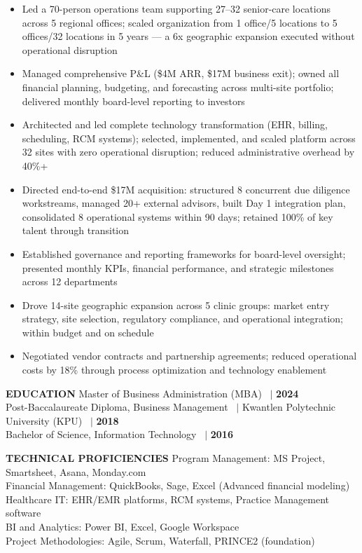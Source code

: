 \documentclass[10pt]{article}
\begin{document}
\begin{itemize}[leftmargin=15pt,itemsep=3pt]
\item Led a 70-person operations team supporting 27--32 senior-care locations across 5 regional offices; scaled organization from 1 office/5 locations to 5 offices/32 locations in 5 years --- a 6x geographic expansion executed without operational disruption
\item Managed comprehensive P\&L (\$4M ARR, \$17M business exit); owned all financial planning, budgeting, and forecasting across multi-site portfolio; delivered monthly board-level reporting to investors
\item Architected and led complete technology transformation (EHR, billing, scheduling, RCM systems); selected, implemented, and scaled platform across 32 sites with zero operational disruption; reduced administrative overhead by 40\%+
\item Directed end-to-end \$17M acquisition: structured 8 concurrent due diligence workstreams, managed 20+ external advisors, built Day 1 integration plan, consolidated 8 operational systems within 90 days; retained 100\% of key talent through transition
\item Established governance and reporting frameworks for board-level oversight; presented monthly KPIs, financial performance, and strategic milestones across 12 departments
\item Drove 14-site geographic expansion across 5 clinic groups: market entry strategy, site selection, regulatory compliance, and operational integration; within budget and on schedule
\item Negotiated vendor contracts and partnership agreements; reduced operational costs by 18\% through process optimization and technology enablement
\end{itemize}

\vspace{8pt}
\noindent\textbf{EDUCATION}\nopagebreak
\vspace{4pt}
\nopagebreak
Master of Business Administration (MBA) \ $|$ \textbf{2024} \\
Post-Baccalaureate Diploma, Business Management \ $|$ Kwantlen Polytechnic University (KPU) \ $|$ \textbf{2018} \\
Bachelor of Science, Information Technology \ $|$ \textbf{2016}

\vspace{8pt}
\noindent\textbf{TECHNICAL PROFICIENCIES}\nopagebreak
\vspace{4pt}
\nopagebreak
Program Management: MS Project, Smartsheet, Asana, Monday.com \\
Financial Management: QuickBooks, Sage, Excel (Advanced financial modeling) \\
Healthcare IT: EHR/EMR platforms, RCM systems, Practice Management software \\
BI and Analytics: Power BI, Excel, Google Workspace \\
Project Methodologies: Agile, Scrum, Waterfall, PRINCE2 (foundation)
\end{document}
